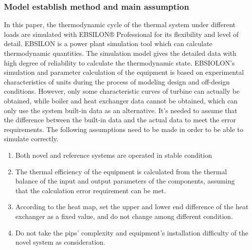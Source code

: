 \documentclass[preprint,12pt]{elsarticle}
\begin{document}
\subsubsection{Model establish method and main assumption}
\label{ssub3:modle description}
In this paper, the thermodynamic cycle of the thermal system under different loads are simulated with EBSILON® Professional for its flexibility and level of detail. 
EBSILON is a power plant simulation tool which can calculate thermodynamic quantities. 
The simulation model gives the detailed data with high degree of reliability to calculate the thermodynamic state.
EBSIOLON's simulation and parameter calculation of the equipment is based on experimental characteristics of units during the process of modeling design and off-design conditions.
However, only some characteristic curves of turbine can actually be obtained, while boiler and heat exchanger data cannot be obtained, which can only use the system built-in data as an alternative.
It’s needed to assume that the difference between the built-in data and the actual data to meet the error requirements.
The following assumptions need to be made in order to be able to simulate correctly.
\begin{enumerate}[(1)]
\item Both novel and reference systems are operated in stable condition
\item The thermal efficiency of the equipment is calculated from the thermal balance of the input and output parameters of the components, assuming that the calculation error requirement can be met.
\item According to the heat map, set the upper and lower end difference of the heat exchanger as a fixed value, and do not change among different condition.
\item  Do not take the pips' complexity and equipment’s installation difficulty of the novel system as consideration.
\end{enumerate}
\end{document}
